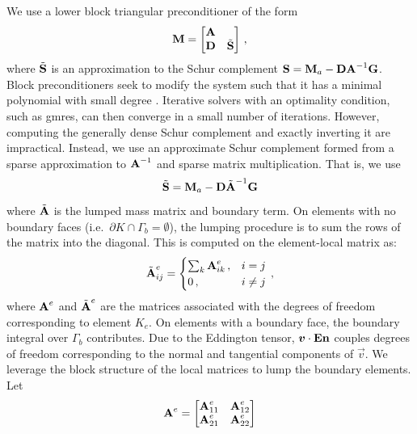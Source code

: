 \documentclass[../doc.tex]{subfiles}
\begin{document}
We use a lower block triangular preconditioner of the form 
	\begin{equation} \label{rtvef:block_prec}
		\boldsymbol{\mathrm{M}} = \begin{bmatrix} 
			\boldsymbol{\mathrm{A}} \\ \boldsymbol{\mathrm{D}} & \tilde{\boldsymbol{\mathrm{S}}}
		\end{bmatrix} \,,
	\end{equation}
where $\tilde{\boldsymbol{\mathrm{S}}}$ is an approximation to the Schur complement $\boldsymbol{\mathrm{S}} = \boldsymbol{\mathrm{M}}_a - \boldsymbol{\mathrm{D}}\boldsymbol{\mathrm{A}}^{-1}\boldsymbol{\mathrm{G}}$. Block preconditioners seek to modify the system such that it has a minimal polynomial with small degree \cite{benzi_golub_liesen_2005}. Iterative solvers with an optimality condition, such as \gls{gmres}, can then converge in a small number of iterations. However, computing the generally dense Schur complement and exactly inverting it are impractical. Instead, we use an approximate Schur complement formed from a sparse approximation to $\boldsymbol{\mathrm{A}}^{-1}$ and sparse matrix multiplication. That is, we use
	\begin{equation}
		\tilde{\boldsymbol{\mathrm{S}}} = \boldsymbol{\mathrm{M}}_a - \boldsymbol{\mathrm{D}}\tilde{\boldsymbol{\mathrm{A}}}^{-1}\boldsymbol{\mathrm{G}} 
	\end{equation}
where $\tilde{\boldsymbol{\mathrm{A}}}$ is the lumped mass matrix and boundary term. On elements with no boundary faces (i.e.~$\partial K \cap \Gamma_b = \emptyset$), the lumping procedure is to sum the rows of the matrix into the diagonal. This is computed on the element-local matrix as: 
	\begin{equation}
		\tilde{\boldsymbol{\mathrm{A}}}^e_{ij} = \begin{cases}
			\sum_{k} \boldsymbol{\mathrm{A}}_{ik}^e \,, & i=j \\ 
			0 \,, & i\neq j 
		\end{cases} \,, 
	\end{equation}
where $\boldsymbol{\mathrm{A}}^e$ and $\tilde{\boldsymbol{\mathrm{A}}}^e$ are the matrices associated with the degrees of freedom corresponding to element $K_e$. 
On elements with a boundary face, the boundary integral over $\Gamma_b$ contributes. Due to the Eddington tensor, $\boldsymbol{v}\cdot\boldsymbol{\mathrm{E}}\boldsymbol{\mathrm{n}}$ couples degrees of freedom corresponding to the normal and tangential components of $\vec{v}$. We leverage the block structure of the local matrices to lump the boundary elements. Let 
	\begin{equation}
		\boldsymbol{\mathrm{A}}^e = \begin{bmatrix} 
			\boldsymbol{\mathrm{A}}^e_{11} & \boldsymbol{\mathrm{A}}^e_{12} \\ 
			\boldsymbol{\mathrm{A}}^e_{21} & \boldsymbol{\mathrm{A}}^e_{22} 
		\end{bmatrix}
	\end{equation}
\end{document}
